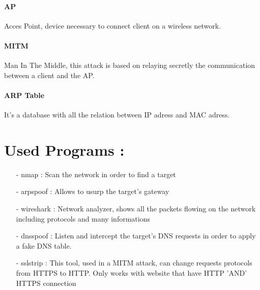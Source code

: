 \documentclass[a4paper, 11pt, oneside]{article}
\begin{document}
\paragraph{AP}
Acces Point, device necessary to connect client on a wireless network.\\

\paragraph{MITM}
Man In The Middle, this attack is based on relaying secretly the communication between a client and the AP.\\

\paragraph{ARP Table}
It's a database with all the relation between IP adress and MAC adress.\\

\section*{Used Programs :}
\begin{itemize}
    \item[-] nmap : Scan the network in order to find a target\\
    \item[-] arpspoof : Allows to usurp the target's gateway\\
    \item[-] wireshark : Network analyzer, shows all the packets flowing on the network including protocols and many informations\\
    \item[-] dnsspoof : Listen and intercept the target's DNS requests in order to apply a fake DNS table.\\
    \item[-] sslstrip : This tool, used in a MITM attack, can change requests protocols from HTTPS to HTTP. Only works with website that have HTTP 'AND' HTTPS connection\\
\end{itemize}
\end{document}

